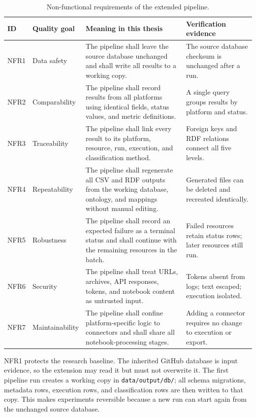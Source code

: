 \begin{table}[H]
\centering
\caption{Non-functional requirements of the extended pipeline.}
\label{tab:nonfunctional-requirements}
\footnotesize
\begin{tabularx}{\textwidth}{@{}>{\raggedright\arraybackslash}p{1.05cm}>{\raggedright\arraybackslash}p{2.45cm}>{\raggedright\arraybackslash}p{5.1cm}>{\raggedright\arraybackslash}X@{}}
\toprule
ID & Quality goal & Meaning in this thesis & Verification evidence\tabularnewline
\midrule
NFR1 & Data safety & The pipeline shall leave the source database unchanged and shall write all results to a working copy. & The source database checksum is unchanged after a run.\tabularnewline
NFR2 & Comparability & The pipeline shall record results from all platforms using identical fields, status values, and metric definitions. & A single query groups results by platform and status.\tabularnewline
NFR3 & Traceability & The pipeline shall link every result to its platform, resource, run, execution, and classification method. & Foreign keys and RDF relations connect all five levels.\tabularnewline
NFR4 & Repeatability & The pipeline shall regenerate all CSV and RDF outputs from the working database, ontology, and mappings without manual editing. & Generated files can be deleted and recreated identically.\tabularnewline
NFR5 & Robustness & The pipeline shall record an expected failure as a terminal status and shall continue with the remaining resources in the batch. & Failed resources retain status rows; later resources still run.\tabularnewline
NFR6 & Security & The pipeline shall treat URLs, archives, API responses, tokens, and notebook content as untrusted input. & Tokens absent from logs; text escaped; execution isolated.\tabularnewline
NFR7 & Maintainability & The pipeline shall confine platform-specific logic to connectors and shall share all notebook-processing stages. & Adding a connector requires no change to execution or export.\tabularnewline
\bottomrule
\end{tabularx}
\end{table}

NFR1 protects the research baseline. The inherited GitHub database is input evidence, so the extension may read it but must not overwrite it. The first pipeline run creates a working copy in \texttt{data/output/db/}; all schema migrations, metadata rows, execution rows, and classification rows are then written to that copy. This makes experiments reversible because a new run can start again from the unchanged source database.

